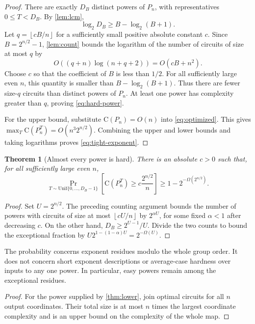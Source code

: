 \documentclass[11pt]{article}
\newtheorem{theorem}{Theorem}[section]
\newtheorem{corollary}[theorem]{Corollary}
\theoremstyle{definition}
\theoremstyle{remark}
\newcommand{\CC}{\mathrm{C}}
\newcommand{\floor}[1]{\left\lfloor #1\right\rfloor}
\numberwithin{equation}{section}
\begin{document}
\begin{proof}
There are exactly $D_B$ distinct powers of $P_n$, with representatives
$0\leq T<D_B$.  By \cref{lem:lcm},
\[
  \log_2 D_B\geq B-\log_2(B+1).
\]
Let $q=\floor{cB/n}$ for a sufficiently small positive absolute constant
$c$.  Since $B=2^{n/2}-1$, \cref{lem:count} bounds the logarithm of the
number of circuits of size at most $q$ by
\[
  O((q+n)\log(n+q+2))=O(cB+n^2).
\]
Choose $c$ so that the coefficient of $B$ is less than $1/2$.
For all sufficiently large even $n$, this quantity is smaller than
$B-\log_2(B+1)$.  Thus there are fewer size-$q$ circuits than distinct
powers of $P_n$.  At least one power has complexity greater than $q$,
proving \cref{eq:hard-power}.

For the upper bound, substitute $\CC(P_n)=O(n)$ into
\cref{eq:optimized}.  This gives
$\max_T\CC(P_n^T)=O(n^3 2^{n/2})$.  Combining the upper and lower
bounds and taking logarithms proves \cref{eq:tight-exponent}.
\end{proof}

\begin{theorem}[Almost every power is hard]\label{thm:typical-powers}
There is an absolute $c>0$ such that, for all sufficiently large even $n$,
\[
 \Pr_{T\sim\mathrm{Unif}\{0,\ldots,D_B-1\}}
 \left[\CC(P_n^T)\geq c\frac{2^{n/2}}n\right]
 \geq 1-2^{-\Omega(2^{n/2})}.
\]
\end{theorem}

\begin{proof}
Set $U=2^{n/2}$.  The preceding counting argument bounds the number of
powers with circuits of size at most $\floor{cU/n}$ by $2^{\alpha U}$,
for some fixed $\alpha<1$ after decreasing $c$.  On the other hand,
$D_B\geq2^{U-1}/U$.  Divide the two counts to bound the exceptional
fraction by $U2^{1-(1-\alpha)U}=2^{-\Omega(U)}$.
\end{proof}

The probability concerns exponent residues modulo the whole group order.
It does not concern short exponent descriptions or average-case hardness
over inputs to any one power.  In particular, easy powers remain among
the exceptional residues.


\begin{proof}
For the power supplied by \cref{thm:lower}, join optimal circuits for all
$n$ output coordinates.  Their total size is at most $n$ times the
largest coordinate complexity and is an upper bound on the complexity
of the whole map.
\end{proof}
\end{document}
